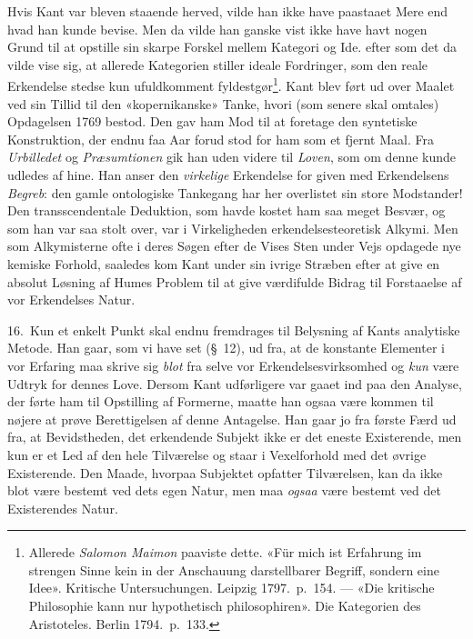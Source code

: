 \documentclass[12pt,a4paper]{article}
\newcommand{\apage}[1]{\marginnote{\footnotesize\textit{[#1]}}}
\begin{document}
Hvis Kant var bleven staaende herved, vilde han ikke have paastaaet Mere
end hvad han kunde bevise. Men da vilde han ganske vist ikke have havt
nogen Grund til at opstille sin skarpe Forskel mellem Kategori og Ide. efter som det da vilde vise sig, at allerede Kategorien stiller ideale
Fordringer, som den reale Erkendelse stedse kun ufuldkomment
fyldestgør\footnote{Allerede \emph{Salomon Maimon} paaviste dette. «Für mich ist
Erfahrung im strengen Sinne kein in der Anschauung darstellbarer Begriff,
sondern eine Idee». Kritische Untersuchungen. Leipzig 1797.\ p.\
154. --- «Die kritische Philosophie kann nur hypothetisch philosophiren».
Die Kategorien des Aristoteles. Berlin 1794.\ p.\ 133.}. Kant
blev ført ud over Maalet ved sin Tillid til den «kopernikanske» Tanke,
hvori (som senere skal omtales) Opdagelsen 1769 bestod. Den gav ham Mod
til at foretage den syntetiske Konstruktion, der endnu faa Aar forud stod
for ham \apage{33} som et fjernt Maal. Fra \emph{Urbilledet} og \emph{Præsumtionen} gik han uden
videre til \emph{Loven}, som om denne kunde udledes af hine. Han anser den
\emph{virkelige} Erkendelse for given med Erkendelsens \emph{Begreb}: den gamle
ontologiske Tankegang har her overlistet sin store Modstander! Den
transscendentale Deduktion, som havde kostet ham saa meget Besvær, og som
han var saa stolt over, var i Virkeligheden erkendelsesteoretisk Alkymi.
Men som Alkymisterne ofte i deres Søgen efter de Vises Sten under Vejs
opdagede nye kemiske Forhold, saaledes kom Kant under sin ivrige Stræben
efter at give en absolut Løsning af Humes Problem til at give værdifulde
Bidrag til Forstaaelse af vor Erkendelses Natur.

16.\ Kun et enkelt Punkt skal endnu fremdrages til Belysning af Kants
analytiske Metode. Han gaar, som vi have set (§\ 12), ud fra, at de
konstante Elementer i vor Erfaring maa skrive sig \emph{blot} fra selve vor
Erkendelsesvirksomhed og \emph{kun} være Udtryk for dennes Love. Dersom Kant
udførligere var gaaet ind paa den Analyse, der førte ham til Opstilling
af Formerne, maatte han ogsaa være kommen til nøjere at prøve
Berettigelsen af denne Antagelse. Han gaar jo fra første Færd ud fra, at
Bevidstheden, det erkendende Subjekt ikke er det eneste Existerende, men
kun er et Led af den hele Tilværelse og staar i Vexelforhold med det
øvrige Existerende. Den Maade, hvorpaa Subjektet opfatter Tilværelsen,
kan da ikke blot være bestemt ved dets egen Natur, men maa \emph{ogsaa} være
bestemt ved det Existerendes Natur.
\end{document}
